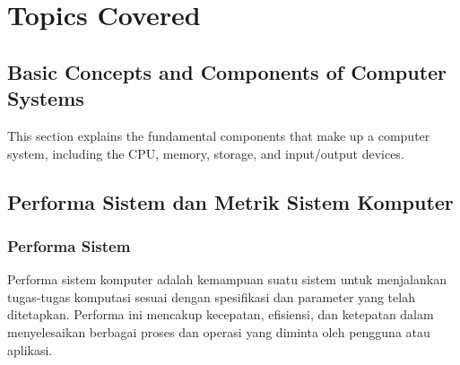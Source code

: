 \documentclass[12pt]{article}
\begin{document}
\section{Topics Covered}

\subsection{Basic Concepts and Components of Computer Systems}
This section explains the fundamental components that make up a computer system, including the CPU, memory, storage, and input/output devices.

\subsection{Performa Sistem dan Metrik Sistem Komputer}
\subsubsection{Performa Sistem}
Performa sistem komputer adalah kemampuan suatu sistem untuk menjalankan tugas-tugas komputasi sesuai dengan spesifikasi dan parameter yang telah ditetapkan. Performa ini mencakup kecepatan, efisiensi, dan ketepatan dalam menyelesaikan berbagai proses dan operasi yang diminta oleh pengguna atau aplikasi.
\end{document}
